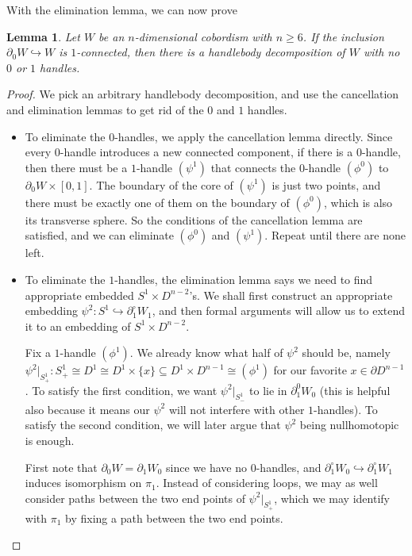 \documentclass[a4paper, 12pt]{article}
\newtheorem{lemma}[thm]{Lemma}
\theoremstyle{definition}
\begin{document}
With the elimination lemma, we can now prove
\begin{lemma}
  Let $W$ be an $n$-dimensional cobordism with $n \geq 6$. If the inclusion $\partial_0 W \hookrightarrow W$ is $1$-connected, then there is a handlebody decomposition of $W$ with no $0$ or $1$ handles.
\end{lemma}
\begin{proof}
  We pick an arbitrary handlebody decomposition, and use the cancellation and elimination lemmas to get rid of the $0$ and $1$ handles.
  \begin{itemize}
    \item To eliminate the $0$-handles, we apply the cancellation lemma directly. Since every $0$-handle introduces a new connected component, if there is a $0$-handle, then there must be a $1$-handle $(\psi^1)$ that connects the $0$-handle $(\phi^0)$ to $\partial_0 W \times [0, 1]$. The boundary of the core of $(\psi^1)$ is just two points, and there must be exactly one of them on the boundary of $(\phi^0)$, which is also its transverse sphere. So the conditions of the cancellation lemma are satisfied, and we can eliminate $(\phi^0)$ and $(\psi^1)$. Repeat until there are none left.
    \item To eliminate the $1$-handles, the elimination lemma says we need to find appropriate embedded $S^1 \times D^{n - 2}$'s. We shall first construct an appropriate embedding $\psi^2: S^1 \hookrightarrow \partial_1^\circ W_1$, and then formal arguments will allow us to extend it to an embedding of $S^1 \times D^{n - 2}$.

      Fix a $1$-handle $(\phi^1)$. We already know what half of $\psi^2$ should be, namely $\psi^2|_{S^1_+} : S^1_+ \cong D^1 \cong D^1 \times \{x\} \subseteq D^1 \times D^{n - 1} \cong (\phi^1)$ for our favorite $x \in \partial D^{n - 1}$. To satisfy the first condition, we want $\psi^2|_{S^1_-}$ to lie in $\partial_1^0 W_0$ (this is helpful also because it means our $\psi^2$ will not interfere with other $1$-handles). To satisfy the second condition, we will later argue that $\psi^2$ being nullhomotopic is enough.

      First note that $\partial_0 W = \partial_1 W_0$ since we have no $0$-handles, and $\partial_1^\circ W_0 \hookrightarrow \partial_1^\circ W_1$ induces isomorphism on $\pi_1$. Instead of considering loops, we may as well consider paths between the two end points of $\psi^2|_{S^1_+}$, which we may identify with $\pi_1$ by fixing a path between the two end points.


\end{itemize}
\end{proof}
\end{document}
